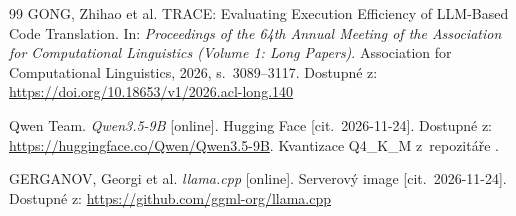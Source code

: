 \begin{thebibliography}{99}
GONG, Zhihao et al. TRACE: Evaluating Execution Efficiency of LLM-Based Code Translation. In: \emph{Proceedings of the 64th Annual Meeting of the Association for Computational Linguistics (Volume 1: Long Papers)}. Association for Computational Linguistics, 2026, s.~3089--3117. Dostupné z: \url{https://doi.org/10.18653/v1/2026.acl-long.140}

Qwen Team. \emph{Qwen3.5-9B} [online]. Hugging Face [cit.~\mbox{2026-11-24}]. Dostupné z: \url{https://huggingface.co/Qwen/Qwen3.5-9B}. Kvantizace Q4\_K\_M z~repozitáře .

GERGANOV, Georgi et al. \emph{llama.cpp} [online]. Serverový image  [cit.~\mbox{2026-11-24}]. Dostupné z: \url{https://github.com/ggml-org/llama.cpp}

\end{thebibliography}


